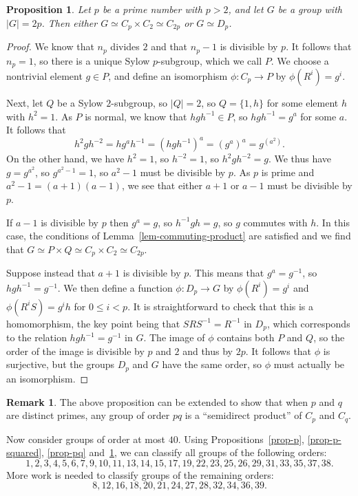 \documentclass{amsart}
\newcommand{\tm}        {\times}
\newcommand{\xra}       {\xrightarrow}
\renewcommand{\:}{\colon}
\newtheorem{proposition}[theorem]{Proposition}
\theoremstyle{definition}
\newtheorem{remark}[theorem]{Remark}
\begin{document}
\begin{proposition}\label{prop-two-p}
 Let $p$ be a prime number with $p>2$, and let $G$ be a group with
 $|G|=2p$.  Then either $G\simeq C_p\tm C_2\simeq C_{2p}$ or
 $G\simeq D_p$.
\end{proposition}
\begin{proof}
 We know that $n_p$ divides $2$ and that $n_p-1$ is divisible by $p$.
 It follows that $n_p=1$, so there is a unique Sylow $p$-subgroup,
 which we call $P$.  We choose a nontrivial element $g\in P$, and
 define an isomorphism $\phi\:C_p\xra{}P$ by $\phi(R^i)=g^i$.

 Next, let $Q$ be a Sylow $2$-subgroup, so $|Q|=2$, so $Q=\{1,h\}$ for
 some element $h$ with $h^2=1$.  As $P$ is normal, we know that
 $hgh^{-1}\in P$, so $hgh^{-1}=g^a$ for some $a$.  It follows that
 \[ h^2gh^{-2}=hg^ah^{-1} = (hgh^{-1})^a = (g^a)^a = g^{(a^2)}. \]
 On the other hand, we have $h^2=1$, so $h^{-2}=1$, so
 $h^2gh^{-2}=g$.  We thus have $g=g^{a^2}$, so $g^{a^2-1}=1$, so
 $a^2-1$ must be divisible by $p$.  As $p$ is prime and
 $a^2-1=(a+1)(a-1)$, we see that either $a+1$ or $a-1$ must be
 divisible by $p$.

 If $a-1$ is divisible by $p$ then $g^a=g$, so $h^{-1}gh=g$, so $g$
 commutes with $h$.  In this case, the conditions of
 Lemma~\ref{lem-commuting-product} are satisfied and we find that
 $G\simeq P\tm Q\simeq C_p\tm C_2\simeq C_{2p}$.  

 Suppose instead that $a+1$ is divisible by $p$.  This means that
 $g^a=g^{-1}$, so $hgh^{-1}=g^{-1}$.  We then define a function
 $\phi\:D_p\xra{}G$ by $\phi(R^i)=g^i$ and $\phi(R^iS)=g^ih$ for
 $0\leq i<p$.  It is straightforward to check that this is a
 homomorphism, the key point being that $SRS^{-1}=R^{-1}$ in $D_p$,
 which corresponds to the relation $hgh^{-1}=g^{-1}$ in $G$.  The
 image of $\phi$ contains both $P$ and $Q$, so the order of the image
 is divisible by $p$ and $2$ and thus by $2p$.  It follows that $\phi$
 is surjective, but the groups $D_p$ and $G$ have the same order, so
 $\phi$ must actually be an isomorphism.
\end{proof}

\begin{remark}
 The above proposition can be extended to show that when $p$ and $q$
 are distinct primes, any group of order $pq$ is a ``semidirect
 product'' of $C_p$ and $C_q$.
\end{remark}

Now consider groups of order at most $40$.  Using
Propositions~\ref{prop-p}, \ref{prop-p-squared}, \ref{prop-pq}
and~\ref{prop-two-p}, we can classify all groups of the following
orders:
\[ 1,2,3,4,5,6,7,9,10,11,13,14,15,17,19,22,23,
   25,26,29,31,33,35,37,38.
\]
More work is needed to classify groups of the remaining orders:
\[ 8,12,16,18,20,21,24,27,28,32,34,36,39. \]
\end{document}

